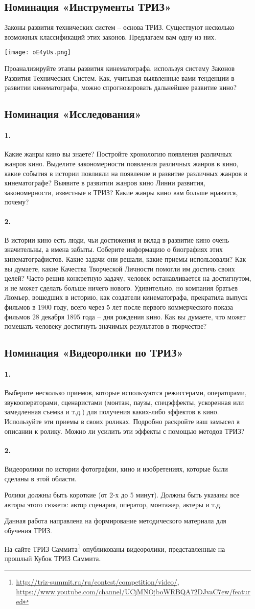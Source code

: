 \documentclass[11pt,a4paper]{article}
\newcommand{\video}{Ролики должны быть короткие (от 2-х до 5 минут). Должны
  быть указаны все авторы этого сюжета: автор сценария, оператор, монтажер,
  актеры и т.д.

Данная работа направлена на формирование методического материала для обучения
ТРИЗ.

На сайте ТРИЗ
Саммита\footnote{\url{http://triz-summit.ru/ru/contest/competition/video/},\\
  \url{https://www.youtube.com/channel/UCjMNOjboWRBQA72DJvaC7ew/featured}}
опубликованы видеоролики, представленные на прошлый Кубок ТРИЗ Саммита.}
\newcommand{\kinogenres}{
\paragraph{1.}
Какие жанры кино вы знаете? Постройте хронологию появления различных жанров
кино. Выделите закономерности появления различных жанров в кино, какие события
в истории повлияли на появление и развитие различных жанров в кинематографе?
Выявите в развитии жанров кино Линии развития, закономерности, известные в
ТРИЗ? Какие жанры кино вам больше нравятся, почему?

\paragraph{2.}
В истории кино есть люди, чьи достижения и вклад в развитие кино очень
значительны, а имена забыты. Соберите информацию о биографиях этих
кинематографистов. Какие задачи они решали, какие приемы использовали? Как вы
думаете, какие Качества Творческой Личности помогли им достичь своих целей?
Часто решив конкретную задачу, человек останавливается на достигнутом, и не
может сделать больше ничего нового. Удивительно, но компания братьев Люмьер,
вошедших в историю, как создатели кинематографа, прекратила выпуск фильмов в
1900 году, всего через 5 лет после первого коммерческого показа фильмов 28
декабря 1895 года – дня рождения кино. Как вы думаете, что может помешать
человеку достигнуть значимых результатов в творчестве?
}
\newcommand{\kinotools}{\paragraph{1.}
Выберите несколько приемов, которые используются режиссерами, операторами,
звукооператорами, сценаристами (монтаж, паузы, спецэффекты, ускоренная или
замедленная съемка и т.д.) для получения каких-либо эффектов в кино.
Используйте эти приемы в своих роликах. Подробно раскройте ваш замысел в
описании к ролику. Можно ли усилить эти эффекты с помощью методов ТРИЗ?

\paragraph{2.}
Видеоролики по истории фотографии, кино и изобретениях, которые были сделаны в
этой области.
}
\begin{document}
\subsection*{Номинация «Инструменты ТРИЗ»}

Законы развития технических систем – основа ТРИЗ. Существуют несколько
возможных классификаций этих законов. Предлагаем вам одну из них.
\begin{center}
  \texttt{[image: oE4yUs.png]}
\end{center}
Проанализируйте этапы развития кинематографа, используя систему Законов
Развития Технических Систем. Как, учитывая выявленные вами тенденции в
развитии кинематографа, можно спрогнозировать дальнейшее развитие кино?

\subsection*{Номинация «Исследования»}
\kinogenres

\subsection*{Номинация «Видеоролики по ТРИЗ»}
\kinotools

\video
\end{document}

